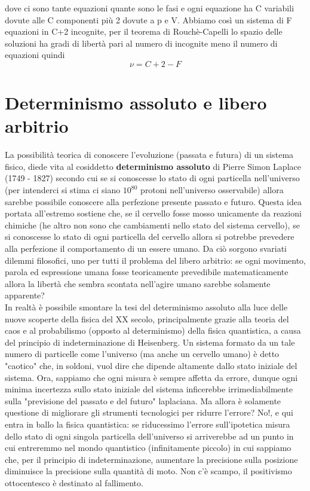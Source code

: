 \documentclass[10pt,a4paper]{article}
\begin{document}
dove ci sono tante equazioni quante sono le fasi e ogni equazione ha C variabili dovute alle C componenti più 2 dovute a p e V. Abbiamo così un sistema di F equazioni in C+2 incognite, per il teorema di Rouchè-Capelli lo spazio delle soluzioni ha gradi di libertà pari al numero di incognite meno il numero di equazioni quindi
\[\nu = C+2-F\]

\appendix
\section{Determinismo assoluto e libero arbitrio}
La possibilità teorica di conoscere l'evoluzione (passata e futura) di un sistema fisico, diede vita al cosiddetto \textbf{determinismo assoluto} di Pierre Simon Laplace (1749 - 1827) secondo cui se si conoscesse lo stato di ogni particella nell'universo (per intenderci si stima ci siano $10^{80}$ protoni nell'universo osservabile) allora sarebbe possibile conoscere alla perfezione presente passato e futuro. Questa idea portata all'estremo sostiene che, se il cervello fosse mosso unicamente da reazioni chimiche (he altro non sono che cambiamenti nello stato del sistema cervello), se si conoscesse lo stato di ogni particella del cervello allora si potrebbe prevedere alla perfezione il comportamento di un essere umano. Da ciò sorgono svariati dilemmi filosofici, uno per tutti il problema del libero arbitrio: se ogni movimento, parola ed espressione umana fosse teoricamente prevedibile matematicamente allora la libertà che sembra scontata nell'agire umano sarebbe solamente apparente?\\
In realtà è possibile smontare la tesi del determinismo assoluto alla luce delle nuove scoperte della fisica del XX secolo, principalmente grazie alla teoria del caos e al probabilismo (opposto al determinismo) della fisica quantistica, a causa del principio di indeterminazione di Heisenberg. Un sistema formato da un tale numero di particelle come l'universo (ma anche un cervello umano) è detto "caotico" che, in soldoni, vuol dire che dipende altamente dallo stato iniziale del sistema. Ora, sappiamo che ogni misura è sempre affetta da errore, dunque ogni minima incertezza sullo stato iniziale del sistema inficerebbe irrimediabilmente sulla "previsione del passato e del futuro" laplaciana. Ma allora è solamente questione di migliorare gli strumenti tecnologici per ridurre l'errore? No!, e qui entra in ballo la fisica quantistica: se riducessimo l'errore sull'ipotetica misura dello stato di ogni singola particella dell'universo si arriverebbe ad un punto in cui entreremmo nel mondo quantistico (infinitamente piccolo) in cui sappiamo che, per il principio di indeterminazione, aumentare la precisione sulla posizione diminuisce la precisione sulla quantità di moto. Non c'è scampo, il positivismo ottocentesco è destinato al fallimento. 
\newpage
\tableofcontents
\end{document}
